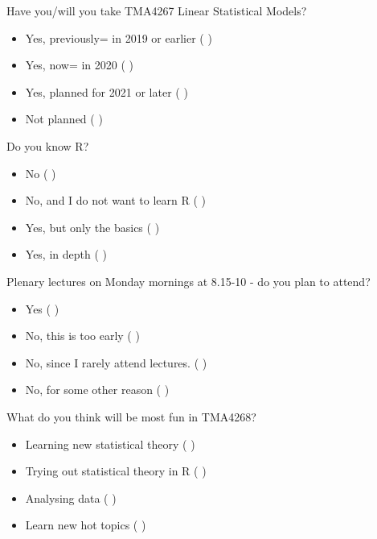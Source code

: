 \documentclass[10pt,ignorenonframetext,]{beamer}
\providecommand{\tightlist}{%
  \setlength{\itemsep}{0pt}\setlength{\parskip}{0pt}}
\begin{document}
\begin{frame}

\begin{block}{Have you/will you take TMA4267 Linear Statistical Models?}

\begin{itemize}
\tightlist
\item
  Yes, previously= in 2019 or earlier ( )
\item
  Yes, now= in 2020 ( )
\item
  Yes, planned for 2021 or later ( )
\item
  Not planned ( )
\end{itemize}

\end{block}

\begin{block}{Do you know R?}

\begin{itemize}
\tightlist
\item
  No ( )
\item
  No, and I do not want to learn R ( )
\item
  Yes, but only the basics ( )
\item
  Yes, in depth ( )
\end{itemize}

\end{block}

\end{frame}

\begin{frame}

\begin{block}{Plenary lectures on Monday mornings at 8.15-10 - do you
plan to attend?}

\begin{itemize}
\tightlist
\item
  Yes ( )
\item
  No, this is too early ( )
\item
  No, since I rarely attend lectures. ( )
\item
  No, for some other reason ( )
\end{itemize}

\end{block}

\begin{block}{What do you think will be most fun in TMA4268?}

\begin{itemize}
\tightlist
\item
  Learning new statistical theory ( )
\item
  Trying out statistical theory in R ( )
\item
  Analysing data ( )
\item
  Learn new hot topics ( )
\end{itemize}

\end{block}

\end{frame}
\end{document}
